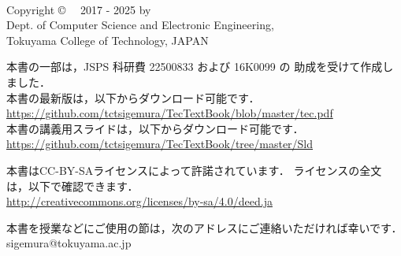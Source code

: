 \documentclass[a4paper,twocolumn,twoside]{ltjsbook}   %
\begin{document}
\thispagestyle{empty}
\onecolumn
~
\vfill
\begin{flushleft}
Copyright \copyright ~~ 2017 - 2025 by \\
Dept. of Computer Science and Electronic Engineering, \\
Tokuyama College of Technology, JAPAN
\end{flushleft}
\vspace{0.4cm}
\begin{flushleft}
本書の一部は，JSPS 科研費 22500833 および 16K0099 の
助成を受けて作成しました．\\
本書の最新版は，以下からダウンロード可能です．\\
\url{https://github.com/tctsigemura/TecTextBook/blob/master/tec.pdf}\\
本書の講義用スライドは，以下からダウンロード可能です．\\
\url{https://github.com/tctsigemura/TecTextBook/tree/master/Sld}
\end{flushleft}
\vspace{0.4cm}
\begin{flushleft}
本書はCC-BY-SAライセンスによって許諾されています．
ライセンスの全文は，以下で確認できます．\\
\url{http://creativecommons.org/licenses/by-sa/4.0/deed.ja}
\end{flushleft}
\begin{flushleft}
本書を授業などにご使用の節は，次のアドレスにご連絡いただければ幸いです．\\
sigemura@tokuyama.ac.jp
\end{flushleft}


\twocolumn
\mainmatter

\appendix
\end{document}
